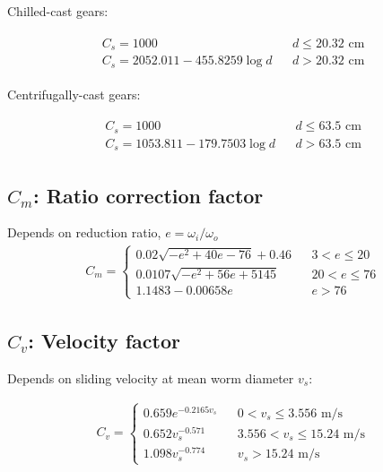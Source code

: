 \documentclass[a4paper,openany,svgnames]{kaobook}
\begin{document}
Chilled-cast gears:

\begin{align*}
  \begin{array}{lll}
    C_{s} = 1000 &  & d \leqslant 20.32 \text{ cm} \\
    C_{s} = 2052.011 - 455.8259 \log d &  & d > 20.32 \text{ cm}
  \end{array}
\end{align*}

Centrifugally-cast gears:

\begin{align*}
  \begin{array}{lll}
    C_{s} = 1000 &  & d \leqslant 63.5 \text{ cm} \\
    C_{s} = 1053.811 - 179.7503 \log d &  & d > 63.5 \text{ cm}
  \end{array}
\end{align*}

\subsection{\(C_{m}\): Ratio correction factor}
\label{sec:orgfd9db7c}

Depends on reduction ratio, \(e = \omega_{i}/\omega_{o}\)
\begin{align*}
  C_{m} = \left\{
  \begin{array}{lll}
    0.02 \sqrt{-e^{2} + 40 e - 76} + 0.46 &  & 3 < e \leqslant 20 \\
    0.0107 \sqrt{-e^{2} + 56e + 5145} &  & 20 < e \leqslant 76 \\
    1.1483 - 0.00658e &  & e > 76
  \end{array} \right.
\end{align*}

\subsection{\(C_{v}\): Velocity factor}
\label{sec:orgd36837c}

Depends on sliding velocity at mean worm diameter \(v_{s}\):

\begin{align*}
  C_{v} = \left\{
  \begin{array}{lll}
    0.659 e^{-0.2165 v_{s}} &  & 0 < v_{s} \leqslant 3.556 \text{ m/s}\\
    0.652 v_{s}^{-0.571} &  & 3.556 < v_{s} \leqslant 15.24 \text{ m/s}\\
    1.098 v_{s}^{-0.774} &  & v_{s} > 15.24 \text{ m/s}
  \end{array} \right.
\end{align*}
\end{document}
